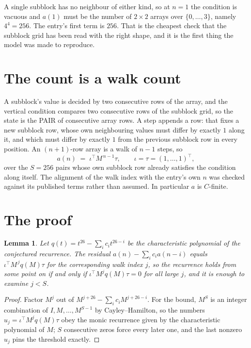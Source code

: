 \documentclass[11pt,a4paper]{article}
\theoremstyle{plain}
\newtheorem{lemma}[theorem]{Lemma}
\theoremstyle{definition}
\begin{document}
A single subblock has no neighbour of either kind, so at $n=1$ the condition is vacuous and
$a(1)$ must be the number of $2\times2$ arrays over $\{0,\dots,3\}$, namely
$4^{4}=256$. The entry's first term is $256$.
That is the cheapest check that the subblock grid has been read with the right shape, and it
is the first thing the model was made to reproduce.

\section{The count is a walk count}

A subblock's value is decided by two consecutive rows of the array, and the
vertical condition compares two consecutive rows of the subblock grid, so the state is the
PAIR of consecutive array rows. A step appends a row: that fixes a new subblock row, whose own
neighbouring values must differ by exactly $1$ along it, and which must differ by exactly
$1$ from the previous subblock row in every position. An $(n+1)$-row array is a walk of
$n-1$ steps, so
\[
a(n)\;=\;\iota^{\!\top}M^{\,n-1}\tau,\qquad\iota=\tau=(1,\dots,1)^{\!\top},
\]
over the $S=256$ pairs whose own subblock row already satisfies the condition along itself.
The alignment of the walk index with the entry's own $n$ was checked against its published
terms rather than assumed. In particular $a$ is $C$-finite.

\section{The proof}

\begin{lemma}\label{lem:crit}
Let $q(t)=t^{26}-\sum_i c_it^{26-i}$ be the characteristic polynomial of the
conjectured recurrence. The residual $a(n)-\sum_ic_ia(n-i)$ equals
$\iota^{\!\top}M^{\,j}q(M)\tau$ for the corresponding walk index $j$, so the recurrence
holds from some point on if and only if $\iota^{\!\top}M^{j}q(M)\tau=0$ for all large $j$,
and it is enough to examine $j<S$.
\end{lemma}

\begin{proof}
Factor $M^{j}$ out of $M^{j+26}-\sum_ic_iM^{j+26-i}$. For the bound, $M^{S}$
is an integer combination of $I,M,\dots,M^{S-1}$ by Cayley--Hamilton, so the numbers
$u_j=\iota^{\!\top}M^{j}q(M)\tau$ obey the monic recurrence given by the characteristic
polynomial of $M$; $S$ consecutive zeros force every later one, and the last nonzero $u_j$
pins the threshold exactly.
\end{proof}
\end{document}
